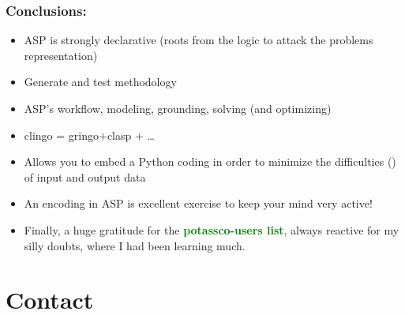 \documentclass{beamer}
\begin{document}

\begin{frame}[fragile] 
	\frametitle{Conclusions:}
	
\begin{block}{}
\begin{itemize}
  

  \item ASP is strongly declarative (roots from the logic to attack the problems representation)
  
  \item Generate and test methodology
    
  \item ASP's workflow, modeling, grounding, solving
    (and optimizing)
  \item clingo = gringo$+$clasp $+$ \dots

  \item Allows you to embed a Python coding in order to minimize the difficulties (\Frowny) of input and output data
		
   \item An encoding in ASP is excellent exercise to keep your mind very active!

	\item Finally, a huge gratitude for the \textcolor{green}{\textbf{potassco-users list}}, always reactive for my silly doubts,  where I had been learning much.
		
	\end{itemize}
\end{block}
\end{frame}



\section*{Contact}
\end{document}
